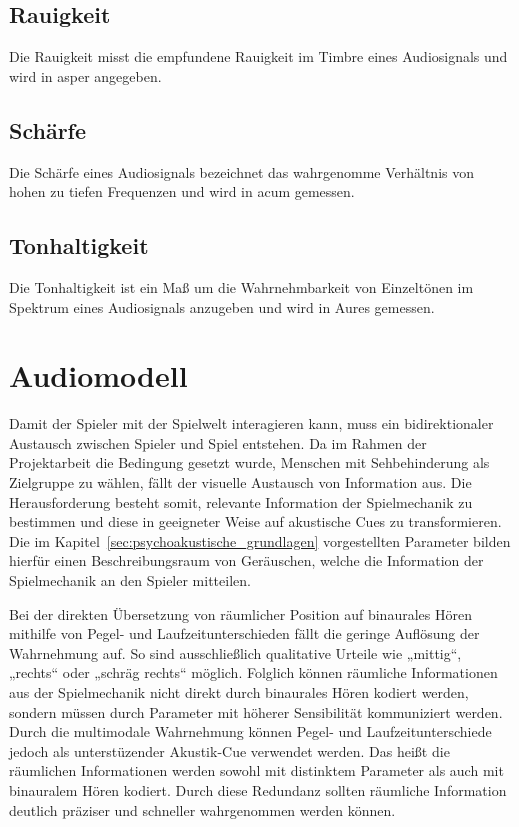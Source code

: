 \documentclass[a4paper, 11pt]{scrartcl}
\begin{document}
\subsection{Rauigkeit}
\label{sub:rauigkeit}

Die Rauigkeit misst die empfundene Rauigkeit im Timbre eines Audiosignals und
wird in asper angegeben.

\subsection{Schärfe}
\label{sub:schaerfe}

Die Schärfe eines Audiosignals bezeichnet das wahrgenomme Verhältnis von hohen
zu tiefen Frequenzen und wird in acum gemessen.

\subsection{Tonhaltigkeit}
\label{sub:tonhaltigkeit}

Die Tonhaltigkeit ist ein Maß um die Wahrnehmbarkeit von Einzeltönen im Spektrum
eines Audiosignals anzugeben und wird in Aures gemessen.

\section{Audiomodell}
\label{sec:audiomodell}

Damit der Spieler mit der Spielwelt interagieren kann, muss ein bidirektionaler
Austausch zwischen Spieler und Spiel entstehen. Da im Rahmen der Projektarbeit
die Bedingung gesetzt wurde, Menschen mit Sehbehinderung als Zielgruppe zu
wählen, fällt der visuelle Austausch von Information aus. Die Herausforderung
besteht somit, relevante Information der Spielmechanik zu bestimmen und diese in
geeigneter Weise auf akustische Cues zu transformieren. Die im
Kapitel~\ref{sec:psychoakustische_grundlagen} vorgestellten Parameter bilden
hierfür einen Beschreibungsraum von Geräuschen, welche die Information der
Spielmechanik an den Spieler mitteilen.

Bei der direkten Übersetzung von räumlicher Position auf binaurales Hören
mithilfe von Pegel- und Laufzeitunterschieden fällt die geringe Auflösung der
Wahrnehmung auf. So sind ausschließlich qualitative Urteile wie „mittig“,
„rechts“ oder „schräg rechts“ möglich. Folglich können räumliche Informationen
aus der Spielmechanik nicht direkt durch binaurales Hören kodiert werden,
sondern müssen durch Parameter mit höherer Sensibilität kommuniziert werden.
Durch die multimodale Wahrnehmung können Pegel- und Laufzeitunterschiede jedoch
als unterstüzender Akustik-Cue verwendet werden. Das heißt die räumlichen
Informationen werden sowohl mit distinktem Parameter als auch mit binauralem
Hören kodiert. Durch diese Redundanz sollten räumliche Information deutlich
präziser und schneller wahrgenommen werden können.
\end{document}
